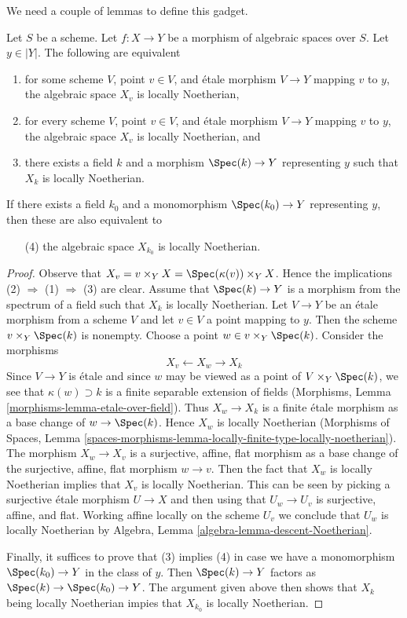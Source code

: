 \noindent
We need a couple of lemmas to define this gadget.

\begin{lemma}
\label{lemma-locally-noetherian-fibre}
Let $S$ be a scheme. Let $f : X \to Y$ be a morphism of algebraic spaces
over $S$. Let $y \in |Y|$. The following are equivalent
\begin{enumerate}
\item for some scheme $V$, point $v \in V$, and \'etale morphism $V \to Y$
mapping $v$ to $y$, the algebraic space $X_v$ is locally Noetherian,
\item for every scheme $V$, point $v \in V$, and \'etale morphism $V \to Y$
mapping $v$ to $y$, the algebraic space $X_v$ is locally Noetherian, and
\item there exists a field $k$ and a morphism $\Spec(k) \to Y$ representing
$y$ such that $X_k$ is locally Noetherian.
\end{enumerate}
If there exists a field $k_0$ and a monomorphism $\Spec(k_0) \to Y$
representing $y$, then these are also equivalent to
\begin{enumerate}
\item[(4)] the algebraic space $X_{k_0}$ is locally Noetherian.
\end{enumerate}
\end{lemma}

\begin{proof}
Observe that $X_v = v \times_Y X = \Spec(\kappa(v)) \times_Y X$.
Hence the implications (2) $\Rightarrow$ (1) $\Rightarrow$ (3) are clear.
Assume that $\Spec(k) \to Y$ is a morphism from the spectrum of a field
such that $X_k$ is locally Noetherian. Let $V \to Y$ be an \'etale morphism
from a scheme $V$ and let $v \in V$ a point mapping to $y$.
Then the scheme $v \times_Y \Spec(k)$ is nonempty. Choose a
point $w \in v \times_Y \Spec(k)$. Consider the morphisms
$$
X_v \longleftarrow X_w \longrightarrow X_k
$$
Since $V \to Y$ is \'etale and since $w$ may be viewed as a point of
$V \times_Y \Spec(k)$, we see that $\kappa(w) \supset k$
is a finite separable extension of fields
(Morphisms, Lemma \ref{morphisms-lemma-etale-over-field}).
Thus $X_w \to X_k$ is a finite \'etale morphism as a base change of
$w \to \Spec(k)$. Hence $X_w$ is locally Noetherian
(Morphisms of Spaces, Lemma
\ref{spaces-morphisms-lemma-locally-finite-type-locally-noetherian}).
The morphism $X_w \to X_v$ is a surjective, affine, flat morphism
as a base change of the surjective, affine, flat morphism $w \to v$.
Then the fact that $X_w$ is locally Noetherian implies that
$X_v$ is locally Noetherian. This can be seen by picking a
surjective \'etale morphism $U \to X$ and then using that
$U_w \to U_v$ is surjective, affine, and flat. Working
affine locally on the scheme $U_v$ we conclude
that $U_w$ is locally Noetherian by
Algebra, Lemma \ref{algebra-lemma-descent-Noetherian}.

\medskip\noindent
Finally, it suffices to prove that (3) implies (4)
in case we have a monomorphism $\Spec(k_0) \to Y$ in the class of $y$.
Then $\Spec(k) \to Y$ factors as $\Spec(k) \to \Spec(k_0) \to Y$.
The argument given above then shows that $X_k$ being
locally Noetherian impies that $X_{k_0}$ is locally Noetherian.
\end{proof}

